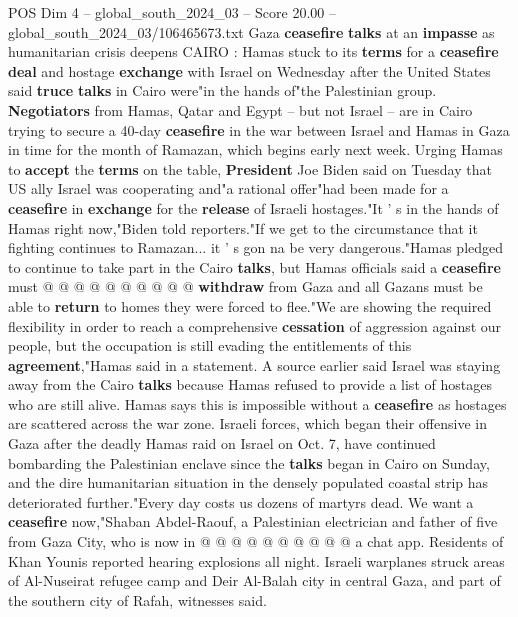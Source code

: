 \begin{textsample}{POS Dim 4 – global\_south\_2024\_03 – Score 20.00 – global\_south\_2024\_03/106465673.txt}  \label{ex:f4_pos_103}
Gaza \textbf{ceasefire} \textbf{talks} at an \textbf{impasse} as humanitarian crisis deepens CAIRO : Hamas stuck to its \textbf{terms} for a \textbf{ceasefire} \textbf{deal} and hostage \textbf{exchange} with Israel on Wednesday after the United States said \textbf{truce} \textbf{talks} in Cairo were"in the hands of"the Palestinian group. \textbf{Negotiators} from Hamas, Qatar and Egypt -- but not Israel -- are in Cairo trying to secure a 40-day \textbf{ceasefire} in the war between Israel and Hamas in Gaza in time for the month of Ramazan, which begins early next week.
Urging Hamas to \textbf{accept} the \textbf{terms} on the table, \textbf{President} Joe Biden said on Tuesday that US ally Israel was cooperating and"a rational offer"had been made for a \textbf{ceasefire} in \textbf{exchange} for the \textbf{release} of Israeli hostages."It ' s in the hands of Hamas right now,"Biden told reporters."If we get to the circumstance that it fighting continues to Ramazan... it ' s gon na be very dangerous."Hamas pledged to continue to take part in the Cairo \textbf{talks}, but Hamas officials said a \textbf{ceasefire} must @ @ @ @ @ @ @ @ @ @ \textbf{withdraw} from Gaza and all Gazans must be able to \textbf{return} to homes they were forced to flee."We are showing the required flexibility in order to reach a comprehensive \textbf{cessation} of aggression against our people, but the occupation is still evading the entitlements of this \textbf{agreement},"Hamas said in a statement.
A source earlier said Israel was staying away from the Cairo \textbf{talks} because Hamas refused to provide a list of hostages who are still alive.
Hamas says this is impossible without a \textbf{ceasefire} as hostages are scattered across the war zone.
Israeli forces, which began their offensive in Gaza after the deadly Hamas raid on Israel on Oct. 7, have continued bombarding the Palestinian enclave since the \textbf{talks} began in Cairo on Sunday, and the dire humanitarian situation in the densely populated coastal strip has deteriorated further."Every day costs us dozens of martyrs dead.
We want a \textbf{ceasefire} now,"Shaban Abdel-Raouf, a Palestinian electrician and father of five from Gaza City, who is now in @ @ @ @ @ @ @ @ @ @ a chat app.
Residents of Khan Younis reported hearing explosions all night.
Israeli warplanes struck areas of Al-Nuseirat refugee camp and Deir Al-Balah city in central Gaza, and part of the southern city of Rafah, witnesses said.

\end{textsample}
